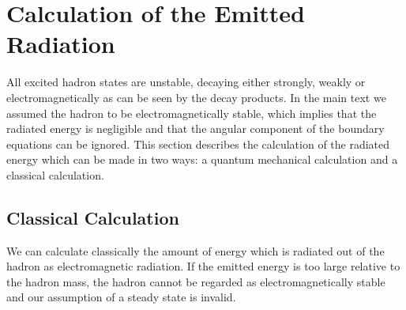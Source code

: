 \documentclass[11pt,a4paper]{article}
\begin{document}
\section{Calculation of the Emitted Radiation}
\label{sec:radiation}

All excited hadron states are unstable, decaying either strongly, weakly or electromagnetically as can be seen by the decay products. In the main text we assumed the hadron to be electromagnetically stable, which implies that the radiated energy is negligible and that the angular component of the boundary equations can be ignored. This section describes the calculation of the radiated energy which can be made in two ways: a quantum mechanical calculation and a classical calculation.

\subsection{Classical Calculation}

We can calculate classically the amount of energy which is radiated out of the hadron as electromagnetic radiation. If the emitted energy is too large relative to the hadron mass, the hadron cannot be regarded as electromagnetically stable and our assumption of a steady state is invalid.
\end{document}
